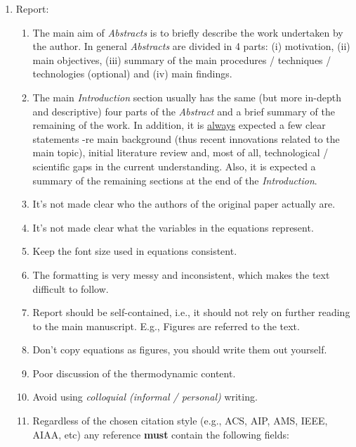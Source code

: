\documentclass[14pt,twoside]{report}
\begin{document}
\begin{enumerate}

\item Report:
\begin{enumerate}
%
\item The main aim of {\it Abstracts} is to briefly describe the work undertaken by the author. In general {\it Abstracts} are divided in 4 parts: (i) motivation, (ii) main objectives, (iii) summary of the main procedures / techniques / technologies (optional) and (iv) main findings. 
%
\item The main {\it Introduction} section usually has the same (but more in-depth and descriptive) four parts of the {\it Abstract} and a brief summary of the remaining of the work. In addition, it is \underline{always} expected a few clear statements -re main background (thus recent innovations related to the main topic), initial literature review and, most of all, technological / scientific gaps in the current understanding. Also, it is expected a summary of the remaining sections at the end of the {\it Introduction}.
%
\item It's not made clear who the authors of the original paper actually are.
%
\item It's not made clear what the variables in the equations represent.
%
\item Keep the font size used in equations consistent.
%
\item The formatting is very messy and inconsistent, which makes the text difficult to follow.
%
\item Report should be self-contained, i.e., it should not rely on further reading to the main manuscript. E.g., Figures are referred to the text.
%
\item Don't copy equations as figures, you should write them out yourself.
%
\item Poor discussion of the thermodynamic content.
%
%
\item Avoid using {\it colloquial (informal / personal)} writing.
%
\item Regardless of the chosen citation style (e.g., ACS, AIP, AMS, IEEE, AIAA, etc) any reference {\bf must} contain the following fields: 
\begin{enumerate}

\end{enumerate}
\end{enumerate}
\end{enumerate}
\end{document}
